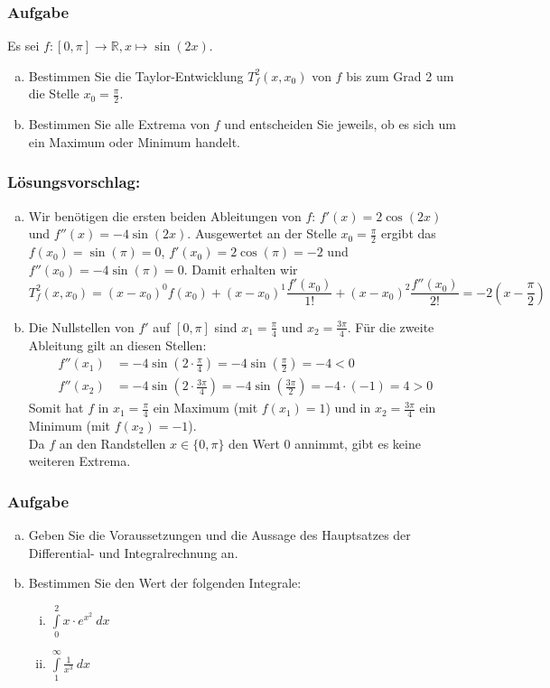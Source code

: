 \documentclass[a4paper,11pt]{scrartcl}
\newcounter{auf}
\newcommand{\Aufgabe}%
        {\addtocounter{auf}{1} \subsubsection*{\rmfamily  Aufgabe \theauf \hspace{1em}} }
\newcommand{\RR}{\mathbb{R}}
\begin{document}
\newpage
\Aufgabe
Es sei $f: [0,\pi] \to \RR, x \mapsto \sin(2x)$.
\begin{enumerate}[a)]
\item Bestimmen Sie die Taylor-Entwicklung $T^2_f(x,x_0)$ von $f$ bis zum Grad 2 um die Stelle $x_0=\frac{\pi}{2}$. 
\item Bestimmen Sie alle Extrema von $f$ und entscheiden Sie jeweils, ob es sich um ein Maximum oder Minimum handelt.
\end{enumerate}


\subsubsection*{Lösungsvorschlag:}
\begin{enumerate}[a)]
\item Wir benötigen die ersten beiden Ableitungen von $f$: $f'(x)=2 \cos(2x)$ und $f''(x)=-4 \sin(2x)$. Ausgewertet an der Stelle $x_0=\frac{\pi}{2}$ ergibt das $f(x_0)=\sin(\pi)=0$, $f'(x_0)=2\cos(\pi)=-2$ und $f''(x_0)=-4\sin(\pi)=0$. Damit erhalten wir
$$
T^2_f(x,x_0)=(x-x_0)^0f(x_0)+(x-x_0)^1\frac{f'(x_0)}{1!} + (x-x_0)^2\frac{f''(x_0)}{2!}=-2(x-\frac{\pi}{2})
$$
\item Die Nullstellen von $f'$ auf $[0, \pi]$ sind $x_1=\frac{\pi}{4}$ und $x_2=\frac{3\pi}{4}$. Für die zweite Ableitung gilt an diesen Stellen:
\begin{align*}
f''(x_1)&=-4\sin(2\cdot \frac{\pi}{4})=-4 \sin(\frac{\pi}{2})=-4 <0\\
f''(x_2)&=-4\sin(2\cdot \frac{3\pi}{4})=-4 \sin(\frac{3\pi}{2})=-4 \cdot (-1)=4 >0
\end{align*}
Somit hat $f$ in $x_1=\frac{\pi}{4}$ ein Maximum (mit $f(x_1)=1$) und in $x_2=\frac{3\pi}{4}$ ein Minimum (mit $f(x_2)=-1$).\\
Da $f$ an den Randstellen $x \in \{0,\pi\}$ den Wert $0$ annimmt, gibt es keine weiteren Extrema.
\end{enumerate}


\newpage
\Aufgabe
\begin{enumerate}[a)]
\item Geben Sie die Voraussetzungen und die Aussage des Hauptsatzes der Differential- und Integralrechnung an.
\item Bestimmen Sie den Wert der folgenden Integrale:
\begin{enumerate}[(i)]
\item \quad$\displaystyle\int \limits_{0}^2 x\cdot e^{x^2} \ dx$
\item \quad$\displaystyle\int \limits_{1}^\infty \frac{1}{x^3}\ dx$
\end{enumerate}
\end{enumerate}
\end{document}
